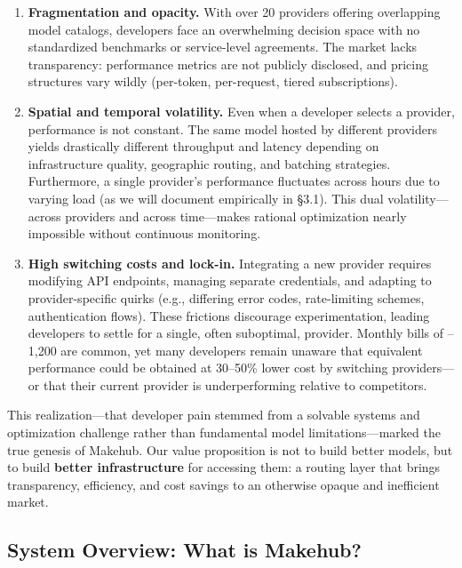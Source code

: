 \documentclass[english]{article}
\begin{document}
\begin{enumerate}
\item \textbf{Fragmentation and opacity.} With over 20 providers offering overlapping model catalogs, developers face an overwhelming decision space with no standardized benchmarks or service-level agreements. The market lacks transparency: performance metrics are not publicly disclosed, and pricing structures vary wildly (per-token, per-request, tiered subscriptions).

\item \textbf{Spatial and temporal volatility.} Even when a developer selects a provider, performance is not constant. The same model hosted by different providers yields drastically different throughput and latency depending on infrastructure quality, geographic routing, and batching strategies. Furthermore, a single provider's performance fluctuates across hours due to varying load (as we will document empirically in §3.1). This dual volatility—across providers and across time—makes rational optimization nearly impossible without continuous monitoring.

\item \textbf{High switching costs and lock-in.} Integrating a new provider requires modifying API endpoints, managing separate credentials, and adapting to provider-specific quirks (e.g., differing error codes, rate-limiting schemes, authentication flows). These frictions discourage experimentation, leading developers to settle for a single, often suboptimal, provider. Monthly bills of --1,200 are common, yet many developers remain unaware that equivalent performance could be obtained at 30--50\% lower cost by switching providers—or that their current provider is underperforming relative to competitors.
\end{enumerate}

\medskip

\noindent This realization—that developer pain stemmed from a solvable systems and optimization challenge rather than fundamental model limitations—marked the true genesis of Makehub. Our value proposition is not to build better models, but to build \textbf{better infrastructure} for accessing them: a routing layer that brings transparency, efficiency, and cost savings to an otherwise opaque and inefficient market.

\subsection{System Overview: What is Makehub?}
\end{document}
